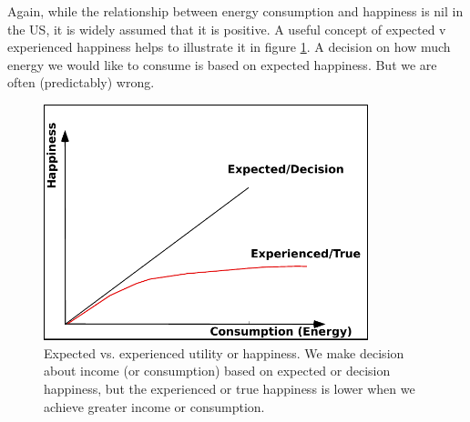 \documentclass[10pt, letterpaper]{article}
\begin{document}
\begin{spacing}{1.4}
%

Again, while the relationship between energy consumption and happiness is nil in
the US, it is widely assumed that it is positive.
A useful concept of expected v experienced happiness helps to illustrate it
\cite{kahneman97ws} in figure \ref{fUT}. A decision on how much energy we would
like to  consume is based on expected happiness. But we are often (predictably) wrong.

\begin{figure}[H]
  \begin{centering}
    \includegraphics[height=2.7in]{graphsAndTables/utility}
    \caption{Expected vs. experienced utility or happiness. We make
      decision about income (or consumption) based on expected or
      decision happiness, but the experienced or true happiness is
      lower when we achieve greater  income or consumption.}\label{fUT}
  \end{centering}
\end{figure}



\end{spacing}
\end{document}
